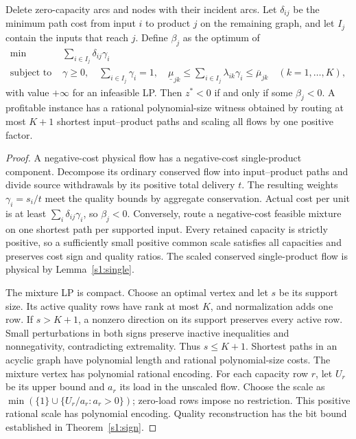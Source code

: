 \begin{theorem}\label{s1:paths}
Delete zero-capacity arcs and nodes with their incident arcs. Let
$\delta_{ij}$ be the minimum path cost from input $i$ to product $j$
on the remaining graph, and let $I_j$ contain the inputs that reach $j$.
Define $\beta_j$ as the optimum of
\begin{align*}
 \min\ &\sum_{i\in I_j}\delta_{ij}\gamma_i\\
 \text{subject to }&\gamma\ge0,\quad\sum_{i\in I_j}\gamma_i=1,\quad
 \underline\mu_{jk}\le\sum_{i\in I_j}\lambda_{ik}\gamma_i
                                  \le\overline\mu_{jk}\quad(k=1,\ldots,K),
\end{align*}
with value $+\infty$ for an infeasible LP. Then $z^*<0$ if and only if
some $\beta_j<0$. A profitable instance has a rational polynomial-size
witness obtained by routing at most $K+1$ shortest input--product paths
and scaling all flows by one positive factor.
\end{theorem}
\begin{proof}
A negative-cost physical flow has a negative-cost single-product
component. Decompose its ordinary conserved flow into input--product
paths and divide source withdrawals by its positive total delivery $t$.
The resulting weights $\gamma_i=s_i/t$ meet the quality bounds by
aggregate conservation. Actual cost per unit is at least
$\sum_i\delta_{ij}\gamma_i$, so $\beta_j<0$.
Conversely, route a negative-cost feasible mixture on one shortest path
per supported input. Every retained capacity is strictly positive, so
a sufficiently small positive common scale satisfies all capacities
and preserves cost sign and quality ratios. The scaled conserved
single-product flow is physical by Lemma~\ref{s1:single}.

The mixture LP is compact. Choose an optimal vertex and let $s$ be its
support size. Its active quality rows have rank at most $K$, and
normalization adds one row. If $s>K+1$, a nonzero direction on its
support preserves every active row. Small perturbations in both signs
preserve inactive inequalities and nonnegativity, contradicting
extremality. Thus $s\le K+1$. Shortest paths in an acyclic graph have
polynomial length and rational polynomial-size costs. The mixture
vertex has polynomial rational encoding. For each capacity row $r$, let
$U_r$ be its upper bound and $a_r$ its load in the unscaled flow. Choose
the scale as $\min(\{1\}\cup\{U_r/a_r:a_r>0\})$; zero-load rows impose
no restriction. This positive rational scale has polynomial encoding.
Quality reconstruction has
the bit bound established in Theorem~\ref{s1:sign}.
\end{proof}

